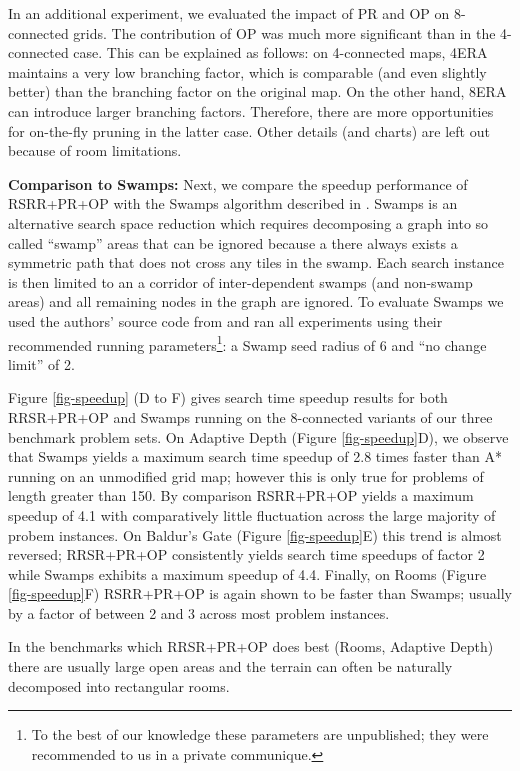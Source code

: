 In an additional experiment, we evaluated the impact of PR and OP on 8-connected grids.
The contribution of OP was much more significant than in the 4-connected case.
This can be explained as follows: on 4-connected maps, 4ERA maintains a very low
branching factor, which is comparable (and even slightly better) than the branching
factor on the original map. On the other hand, 8ERA can introduce larger branching factors.
Therefore, there are more opportunities for on-the-fly pruning in the latter case.
Other details (and charts) are left out because of room limitations.
\par
\textbf{Comparison to Swamps:}
Next, we compare the speedup performance of RSRR+PR+OP with the Swamps algorithm 
described in \cite{pochter10}. Swamps is an alternative search space reduction 
which requires decomposing a graph into so called ``swamp'' areas that can be 
ignored because a there always exists a symmetric path that does not cross any 
tiles in the swamp. 
Each search instance is then limited to an a corridor of inter-dependent 
swamps (and non-swamp areas) and all remaining nodes in the graph are ignored.
To evaluate Swamps we used the authors' source code from \cite{pochter10} and
ran all experiments using their recommended running parameters\footnote{To the best of our knowledge 
these parameters are unpublished; they were recommended to us in a private communique.}:
 a Swamp seed radius of 6 and ``no change limit'' of 2.
\par
Figure \ref{fig-speedup} (D to F) gives search time speedup results for both 
RRSR+PR+OP and Swamps running on the 8-connected variants of our three benchmark 
problem sets. 
On Adaptive Depth (Figure \ref{fig-speedup}D), we observe that 
Swamps yields a maximum search time speedup of 2.8 times faster than 
 A* running on an unmodified grid map; however this is only true for problems of length greater than 150.
By comparison RSRR+PR+OP yields a maximum speedup of 4.1 with comparatively little fluctuation across the
large majority of probem instances.
On Baldur's Gate (Figure \ref{fig-speedup}E) this trend is almost reversed; RRSR+PR+OP consistently 
yields search time speedups of factor 2 while Swamps exhibits a maximum speedup of 4.4.
Finally, on Rooms (Figure \ref{fig-speedup}F) RSRR+PR+OP is again shown to be faster than Swamps;
usually by a factor of between 2 and 3 across most problem instances.
\par
In the benchmarks which RRSR+PR+OP does best (Rooms, Adaptive Depth) 
there are usually large open areas and the terrain can often be naturally decomposed into rectangular rooms.
